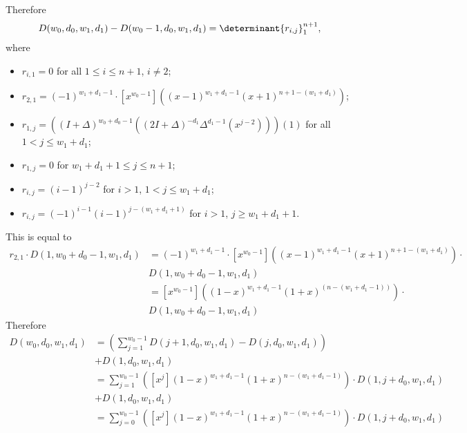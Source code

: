 \documentclass[10pt,reqno]{amsart}
\theoremstyle{plain}
\theoremstyle{definition}
\theoremstyle{remark}
\begin{document}
Therefore
\begin{equation}D(w_0,d_0,w_1,d_1)-D(w_0-1,d_0,w_1,d_1) = 
\determinant{r_{i,j}}_1^{n+1},\end{equation}
where
\begin{itemize}
\item $r_{i,1} = 0$ for all $1\leq i\leq n+1$, $i\ne 2$;
\item $r_{2,1} = (-1)^{w_1+d_1-1}\cdot
[x^{w_0-1}]((x-1)^{w_1+d_1-1} (x+1)^{n+1-(w_1+d_1)})$;
\item $r_{1,j} = 
((I+\Delta)^{w_0+d_0-1}((2I+\Delta)^{-d_1}\Delta^{d_1-1}(x^{j-2})))(1)$
for all $1<j\leq w_1+d_1$;
\item $r_{1,j} = 0$ for $w_1+d_1+1\leq j\leq n+1$;
\item $r_{i,j} = (i-1)^{j-2}$ for $i>1$, $1<j\leq w_1+d_1$;
\item $r_{i,j} = (-1)^{i-1} (i-1)^{j-(w_1+d_1+1)}$ for $i>1$, $j\geq w_1+d_1+1$.
\end{itemize}

This is equal to \begin{equation}
\begin{aligned}
r_{2,1}\cdot D(1,w_0+d_0-1,w_1,d_1) &=
(-1)^{w_1+d_1-1}\cdot 
[x^{w_0-1}]((x-1)^{w_1+d_1-1} (x+1)^{n+1-(w_1+d_1)})\cdot \\
&D(1,w_0+d_0-1,w_1,d_1)\\
&=
[x^{w_0-1}]((1-x)^{w_1+d_1-1}(1+x)^{(n-(w_1+d_1-1))})\cdot \\
&D(1,w_0+d_0-1,w_1,d_1)
\end{aligned}
\end{equation}
Therefore
\begin{equation}
\label{eq:nye}
\begin{aligned}
D(w_0,d_0,w_1,d_1) &=
  (\sum_{j=1}^{w_0-1} D(j+1,d_0,w_1,d_1)-D(j,d_0,w_1,d_1)) \\
  &+ D(1,d_0,w_1,d_1) \\
&=  \sum_{j=1}^{w_0-1} ([x^j](1-x)^{w_1+d_1-1}(1+x)^{n-(w_1+d_1-1)})\cdot
		     D(1,j+d_0,w_1,d_1)\\
&+ D(1,d_0,w_1,d_1)\\
&= \sum_{j=0}^{w_0-1} ([x^j](1-x)^{w_1+d_1-1}(1+x)^{n-(w_1+d_1-1)})\cdot
		     D(1,j+d_0,w_1,d_1)
\end{aligned}
\end{equation}
\end{document}

